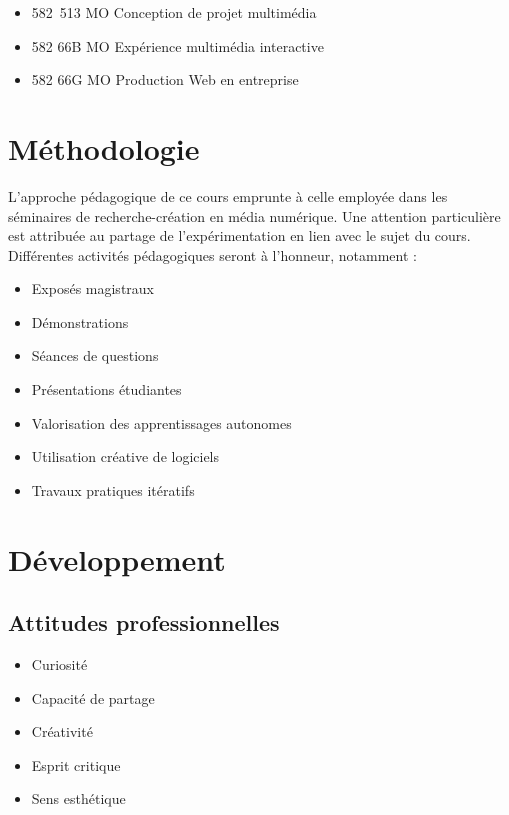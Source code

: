\documentclass[
  french,
]{book}
\providecommand{\tightlist}{%
  \setlength{\itemsep}{0pt}\setlength{\parskip}{0pt}}
\begin{document}
\begin{itemize}
\tightlist
\item
  582~513 MO Conception de projet multimédia
\item
  582 66B MO Expérience multimédia interactive
\item
  582 66G MO Production Web en entreprise
\end{itemize}

\hypertarget{muxe9thodologie}{%
\section{Méthodologie~}\label{muxe9thodologie}}

L'approche pédagogique de ce cours emprunte à celle employée dans les séminaires de recherche-création en média numérique. Une attention particulière est attribuée au partage de l'expérimentation en lien avec le sujet du cours. Différentes activités pédagogiques seront à l'honneur, notamment :

\begin{itemize}
\tightlist
\item
  Exposés magistraux
\item
  Démonstrations
\item
  Séances de questions
\item
  Présentations étudiantes
\item
  Valorisation des apprentissages autonomes
\item
  Utilisation créative de logiciels
\item
  Travaux pratiques itératifs
\end{itemize}

\hypertarget{duxe9veloppement}{%
\section{Développement}\label{duxe9veloppement}}

\hypertarget{attitudes-professionnelles}{%
\subsection{Attitudes professionnelles}\label{attitudes-professionnelles}}

\begin{itemize}
\tightlist
\item
  Curiosité
\item
  Capacité de partage
\item
  Créativité
\item
  Esprit critique
\item
  Sens esthétique
\end{itemize}
\end{document}
